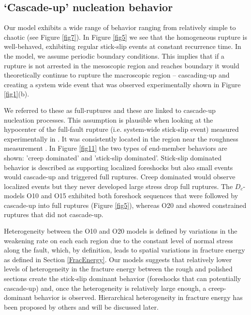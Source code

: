 \documentclass[preprint,1p, 10pt,authoryear]{elsarticle}
\begin{document}
\subsection{`Cascade-up' nucleation behavior}
\label{Cascade_UP}
Our model exhibits a wide range of behavior ranging from relatively simple to chaotic (see Figure \ref{fig7}). In Figure \ref{fig5} we see that the homogeneous rupture is well-behaved, exhibiting regular stick-slip events at constant recurrence time.  In the model, we assume periodic boundary conditions. This implies that if a rupture is not arrested in the mesoscopic region and reaches boundary it would theoretically continue to rupture the macroscopic region -- cascading-up and creating a system wide event that was observed experimentally shown in Figure \ref{fig1}(b). 

We referred to these as full-ruptures and these are linked to cascade-up nucleation processes. This assumption is plausible when looking at the hypocenter of the full-fault rupture (i.e. system-wide stick-slip event) measured experimentally in \citet{Selvadurai2015}. It was consistently located in the region near the roughness measurement \citep[magenta star in fig. 7 and 8 in ][]{Selvadurai2015}. In Figure \ref{fig11} the two types of end-member behaviors are shown: 'creep dominated' and 'stick-slip dominated'. Stick-slip dominated behavior is described as supporting localized foreshocks but also small events would cascade-up and triggered full ruptures. Creep dominated would observe localized events but they never developed large stress drop full ruptures. The $D_{c}$-models O10 and O15 exhibited both foreshock sequences that were followed by cascade-up into full ruptures (Figure \ref{fig5}), whereas O20 and showed constrained ruptures that did not cascade-up. 

Heterogeneity between the O10 and O20 models is defined by variations in the weakening rate on each each region due to the constant level of normal stress along the fault, which, by definition, leads to spatial variations in fracture energy as defined in Section \ref{FracEnergy}. Our models suggests that relatively lower levels of heterogeneity in the fracture energy between the rough and polished sections create the stick-slip dominant behavior (foreshocks that can potentially cascade-up) and, once the heterogeneity is relatively large enough, a creep-dominant behavior is observed. Hierarchical heterogeneity in fracture energy has been proposed by others \citep{Ide2005, Aochi2014, Aochi2017} and will be discussed later.
\end{document}
